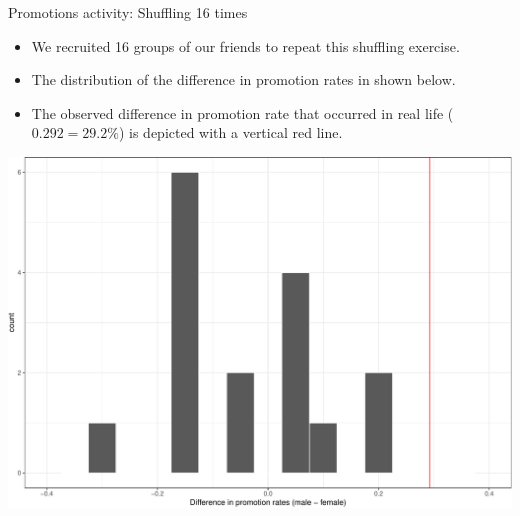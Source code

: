 \documentclass[
  ignorenonframetext,
]{beamer}
\begin{document}
\begin{frame}{Promotions activity: Shuffling 16 times}
\protect\hypertarget{promotions-activity-shuffling-16-times}{}
\begin{itemize}
\item
  We recruited 16 groups of our friends to repeat this shuffling
  exercise.
\item
  The distribution of the difference in promotion rates in shown below.
\item
  The observed difference in promotion rate that occurred in real life
  (\(0.292 = 29.2\%\)) is depicted with a vertical red line.
\end{itemize}

\begin{center}\includegraphics[width=0.7\linewidth,height=0.4\textheight]{Week11_12_13_files/figure-beamer/unnamed-chunk-45-1} \end{center}
\end{frame}
\end{document}
